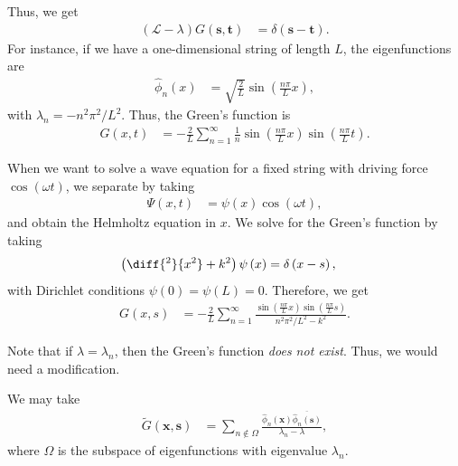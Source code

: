 \documentclass[10pt]{mypackage}
\begin{document}
  Thus, we get
  \begin{align*}
    \left( \mathcal{L}-\lambda \right)G\left( \mathbf{s},\mathbf{t} \right) &= \delta\left( \mathbf{s}-\mathbf{t} \right).
  \end{align*}
  For instance, if we have a one-dimensional string of length $L$, the eigenfunctions are
  \begin{align*}
    \hat{\phi}_n\left( x \right) &= \sqrt{\frac{2}{L}}\sin\left( \frac{n\pi}{L}x \right),
  \end{align*}
  with $\lambda_n = -n^2\pi^2/L^2$. Thus, the Green's function is
  \begin{align*}
    G\left( x,t \right) &= -\frac{2}{L}\sum_{n=1}^{\infty}\frac{1}{n} \sin\left( \frac{n\pi}{L}x \right)\sin\left( \frac{n\pi}{L}t \right).
  \end{align*}
  \begin{example}
    When we want to solve a wave equation for a fixed string with driving force $\cos\left( \omega t \right)$, we separate by taking
    \begin{align*}
      \Psi\left( x,t \right) &= \psi(x)\cos\left( \omega t \right),
    \end{align*}
    and obtain the Helmholtz equation in $x$. We solve for the Green's function by taking
    \begin{align*}
      \left( \diff{^2}{x^2} + k^2 \right)\psi\left( x \right) &= \delta\left( x-s \right),
    \end{align*}
    with Dirichlet conditions $\psi(0) = \psi(L) = 0$. Therefore, we get
    \begin{align*}
      G\left( x,s \right) &= -\frac{2}{L} \sum_{n=1}^{\infty}\frac{\sin\left( \frac{n\pi}{L}x \right)\sin\left( \frac{n\pi}{L}s \right)}{n^2\pi^2/L^2 - k^2}.
    \end{align*}
  \end{example}
  Note that if $\lambda = \lambda_n$, then the Green's function \textit{does not exist}. Thus, we would need a modification.\newline

  We may take
  \begin{align*}
    \widetilde{G}\left( \mathbf{x},\mathbf{s} \right) &= \sum_{n\notin \Omega} \frac{\hat{\phi}_n\left( \mathbf{x} \right) \overline{\hat{\phi}_n\left( \mathbf{s} \right)}}{\lambda_n-\lambda},\label{eq:modified_greens_function}\tag{MGF}
  \end{align*}
  where $\Omega$ is the subspace of eigenfunctions with eigenvalue $\lambda_n$.\newline
\end{document}
